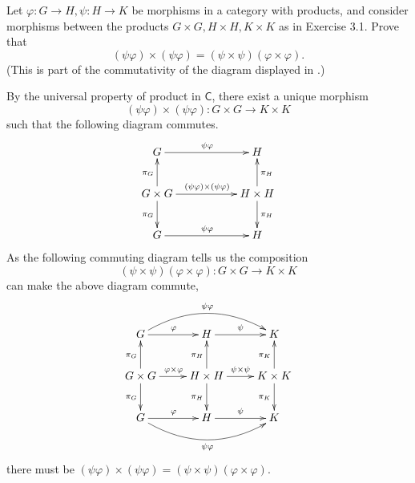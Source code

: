 \documentclass[12pt,letterpaper,boxed]{hmcpset}
\begin{document}
\begin{problem}[3.2]	
	Let $\varphi : G\rightarrow H, \psi : H \rightarrow K$ be morphisms in a category with products, and
	consider morphisms between the products $G\times G, H\times H, K\times K$ as in Exercise 3.1.
	Prove that
	\[
	(\psi\varphi) \times(\psi\varphi)=(\psi \times \psi)(\varphi\times \varphi) .
	\]
	(This is part of the commutativity of the diagram displayed in .)
\end{problem}
\begin{solution}
	By the universal property of product in $\mathsf{C}$, there exist a unique morphism 
	\[
	(\psi\varphi) \times(\psi\varphi):G\times G\rightarrow K\times K
	\] 
	such that the following diagram commutes.
	\[\xymatrix{
		G\ar[rr]^{\psi\varphi} && H \\
		G \times G\ar[u]^{\pi_G}\ar[d]_{\pi_G}\ar[rr]^{	(\psi\varphi) \times(\psi\varphi)} &&  H\times H\ar[u]_{\pi_H}\ar[d]^{\pi_H} \\
		G\ar[rr]^{\psi\varphi} && H 
	}\]
    As the following commuting diagram tells us the composition 
    \[
    (\psi \times \psi)(\varphi\times \varphi):G\times G\rightarrow K\times K
    \]
    can make the above diagram commute,
	\[\xymatrix{
		G\ar[r]^{\varphi}\ar@/^1.6pc/[rr]^{\psi\varphi} & H\ar[r]^{\psi} & K \\
		G \times G\ar[u]^{\pi_G}\ar[d]_{\pi_G}\ar[r]^{\varphi\times\varphi} &  H\times H\ar[u]^{\pi_H}\ar[d]_{\pi_H}\ar[r]^{\psi\times\psi} &  K\times K \ar[u]^{\pi_K}\ar[d]_{\pi_K}\\
		G\ar[r]^{\varphi}\ar@/_1.6pc/[rr]_{\psi\varphi} & H \ar[r]^{\psi} & K
	}\]
    there must be $(\psi\varphi) \times(\psi\varphi)=(\psi \times \psi)(\varphi\times \varphi)$.
    
\end{solution}

~\\
\end{document}
